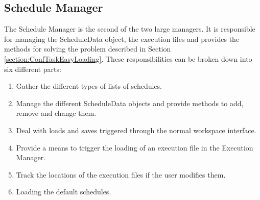 \subsection{Schedule Manager}
\label{section:ScheduleManager}
The Schedule Manager is the second of the two large managers. It is responsible for managing the
ScheduleData object, the execution files and provides the methods for solving the problem described
in Section \ref{section:ConfTaskEasyLoading}. These responsibilities can be broken down into
six different parts:
\begin{enumerate}
 \item Gather the different types of lists of schedules.
 \item Manage the different ScheduleData objects and provide methods to add, remove and change
them.
 \item Deal with loads and saves triggered through the normal workspace interface.
 \item Provide a means to trigger the loading of an execution file in the Execution Manager.
 \item Track the locations of the execution files if the user modifies them.
 \item Loading the default schedules.
\end{enumerate}


